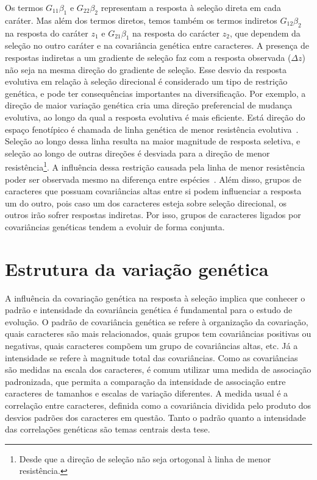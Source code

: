 \begin{refsection}
Os termos $G_{11}\beta_{1}$ e $G_{22}\beta_{2}$ representam a resposta à
seleção direta em cada caráter. Mas além dos termos diretos, temos também  os
termos indiretos $G_{12}\beta_{2}$ na resposta do caráter $z_1$ e
$G_{21}\beta_{1}$ na resposta do carácter $z_2$, que dependem da seleção no
outro caráter e na covariância genética entre caracteres. A presença de
respostas indiretas a um gradiente de seleção faz com a resposta observada
($\Delta z$) não seja na mesma direção do gradiente de seleção. Esse desvio da
resposta evolutiva em relação à seleção direcional é considerado um tipo de
restrição genética, e pode ter consequências importantes na diversificação.
Por exemplo, a direção de maior variação genética cria uma direção
preferencial de mudança evolutiva, ao longo da qual a resposta evolutiva é
mais eficiente. Está direção do espaço fenotípico é chamada de linha genética
de menor resistência evolutiva~\parencite{Schluter1996-gw}. Seleção ao longo
dessa linha resulta na maior magnitude de resposta seletiva, e seleção ao
longo de outras direções é desviada para a direção de menor
resistência\footnote{Desde que a direção de seleção não seja ortogonal à linha
de menor resistência.}. A influência dessa restrição causada pela linha de
menor resistência poder ser observada mesmo na diferença entre
espécies~\parencite{Marroig2005-ce}. Além disso, grupos de caracteres que
possuam covariâncias altas entre si podem influenciar a resposta um do outro,
pois caso um dos caracteres esteja sobre seleção direcional, os outros
irão sofrer respostas indiretas. Por isso, grupos de caracteres ligados por
covariâncias genéticas tendem a evoluir de forma conjunta.

\section{Estrutura da variação genética}

A influência da covariação genética na resposta à seleção implica que conhecer
o padrão e intensidade da covariância genética é fundamental para o estudo de
evolução. O padrão de covariância genética se refere à organização da
covariação, quais caracteres são mais relacionados, quais grupos tem
covariâncias positivas ou negativas, quais caracteres compõem um grupo de
covariâncias altas, etc. Já a intensidade se refere à magnitude total das
covariâncias. Como as covariâncias são medidas na escala dos caracteres, é
comum utilizar uma medida de associação padronizada, que permita a comparação
da intensidade de associação entre caracteres de tamanhos e escalas de
variação diferentes. A medida usual é a correlação entre caracteres, definida
como a covariância dividida pelo produto dos desvios padrões dos caracteres em
questão. Tanto o padrão quanto a intensidade das correlações genéticas são temas
centrais desta tese.


\end{refsection}
